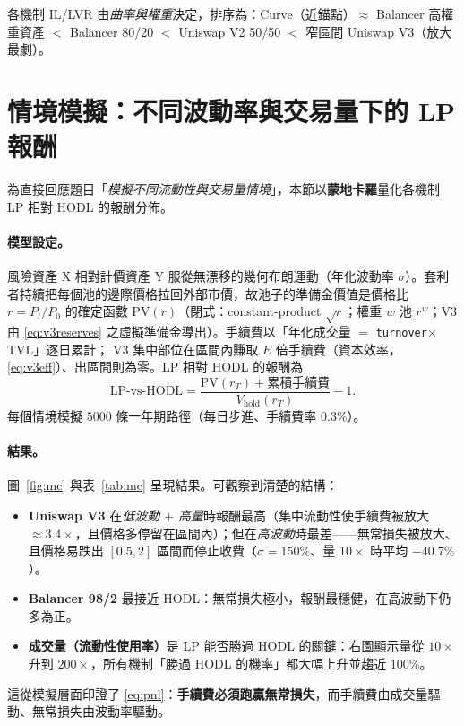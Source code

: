 \documentclass[11pt,a4paper]{article}
\begin{document}
各機制 IL/LVR 由\emph{曲率與權重}決定，排序為：Curve（近錨點）$\approx$ Balancer 高權重資產 $<$ Balancer 80/20 $<$ Uniswap V2 50/50 $<$ 窄區間 Uniswap V3（放大最劇）。

\section{情境模擬：不同波動率與交易量下的 LP 報酬}\label{sec:mc}
為直接回應題目「\emph{模擬不同流動性與交易量情境}」，本節以\textbf{蒙地卡羅}量化各機制 LP 相對 HODL 的報酬分佈。

\paragraph{模型設定。} 風險資產 X 相對計價資產 Y 服從無漂移的幾何布朗運動（年化波動率 $\sigma$）。套利者持續把每個池的邊際價格拉回外部市價，故池子的準備金價值是價格比 $r=P_t/P_0$ 的確定函數
$\mathrm{PV}(r)$（閉式：constant-product $\sqrt{r}$；權重 $w$ 池 $r^{w}$；V3 由 \eqref{eq:v3reserves} 之虛擬準備金導出）。手續費以「年化成交量 $=$ \texttt{turnover}$\times$TVL」逐日累計；
V3 集中部位在區間內賺取 $E$ 倍手續費（資本效率，\eqref{eq:v3eff}）、出區間則為零。LP 相對 HODL 的報酬為
\[
\text{LP-vs-HODL}=\frac{\mathrm{PV}(r_T)+\text{累積手續費}}{V_{\text{hold}}(r_T)}-1 .
\]
每個情境模擬 $5000$ 條一年期路徑（每日步進、手續費率 $0.3\%$）。

\paragraph{結果。} 圖~\ref{fig:mc} 與表~\ref{tab:mc} 呈現結果。可觀察到清楚的結構：
\begin{itemize}
  \item \textbf{Uniswap V3} 在\emph{低波動 $+$ 高量}時報酬最高（集中流動性使手續費被放大 $\approx 3.4\times$，且價格多停留在區間內）；但在\emph{高波動}時最差——無常損失被放大、且價格易跌出 $[0.5,2]$ 區間而停止收費（$\sigma{=}150\%$、量 $10\times$ 時平均 $-40.7\%$）。
  \item \textbf{Balancer 98/2} 最接近 HODL：無常損失極小，報酬最穩健，在高波動下仍多為正。
  \item \textbf{成交量（流動性使用率）}是 LP 能否勝過 HODL 的關鍵：右圖顯示量從 $10\times$ 升到 $200\times$，所有機制「勝過 HODL 的機率」都大幅上升並趨近 100\%。
\end{itemize}
這從模擬層面印證了 \eqref{eq:pnl}：\textbf{手續費必須跑贏無常損失}，而手續費由成交量驅動、無常損失由波動率驅動。
\end{document}
